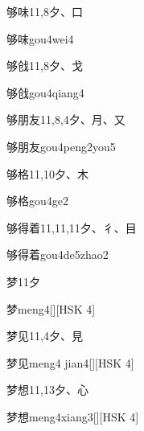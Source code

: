 \begin{Entry}{够味}{11,8}{⼣、⼝}
  \begin{Phonetics}{够味}{gou4wei4}
  \end{Phonetics}
\end{Entry}

\begin{Entry}{够戗}{11,8}{⼣、⼽}
  \begin{Phonetics}{够戗}{gou4qiang4}
  \end{Phonetics}
\end{Entry}

\begin{Entry}{够朋友}{11,8,4}{⼣、⽉、⼜}
  \begin{Phonetics}{够朋友}{gou4peng2you5}
  \end{Phonetics}
\end{Entry}

\begin{Entry}{够格}{11,10}{⼣、⽊}
  \begin{Phonetics}{够格}{gou4ge2}
  \end{Phonetics}
\end{Entry}

\begin{Entry}{够得着}{11,11,11}{⼣、⼻、⽬}
  \begin{Phonetics}{够得着}{gou4de5zhao2}
  \end{Phonetics}
\end{Entry}

\begin{Entry}{梦}{11}{⼣}
  \begin{Phonetics}{梦}{meng4}[][HSK 4]
  \end{Phonetics}
\end{Entry}

\begin{Entry}{梦见}{11,4}{⼣、⾒}
  \begin{Phonetics}{梦见}{meng4 jian4}[][HSK 4]
  \end{Phonetics}
\end{Entry}

\begin{Entry}{梦想}{11,13}{⼣、⼼}
  \begin{Phonetics}{梦想}{meng4xiang3}[][HSK 4]
  \end{Phonetics}
\end{Entry}



